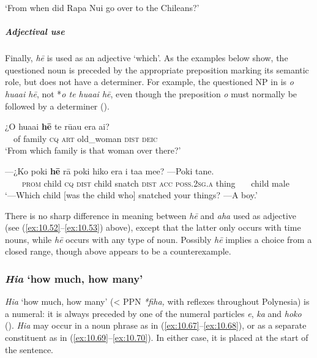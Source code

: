 \glt 
‘From when did Rapa Nui go over to the Chileans?’ \textstyleExampleref{[R616.673]} 
\z

\subparagraph{Adjectival use} Finally, \textit{hē} is used as an adjective ‘which’. As the examples below show, the questioned noun is preceded by the appropriate preposition marking its semantic role, but does not have a determiner. For example, the questioned NP in  is \textit{o hua{\ꞌ}ai hē}, not *\textit{o te hua{\ꞌ}ai hē}, even though the preposition \textit{o} must normally be followed by a determiner ().

\ea\label{ex:10.65}
\gll ¿O hua{\ꞌ}ai \textbf{hē} te rū{\ꞌ}au era {\ꞌ}ai? \\
~~of family \textsc{cq} \textsc{art} old\_woman \textsc{dist} \textsc{deic} \\

\glt 
‘From which family is that woman over there?’ \textstyleExampleref{[R413.305]} 
\z

\ea\label{ex:10.66}
\gll —¿Ko poki \textbf{hē} rā poki hiko era i ta{\ꞌ}a me{\ꞌ}e? —Poki tane. \\
~~~~\textsc{prom} child \textsc{cq} \textsc{dist} child snatch \textsc{dist} \textsc{acc} \textsc{poss.2sg.a} thing ~~~child male \\

\glt
‘—Which child [was the child who] snatched your things? —A boy.’ \textstyleExampleref{[R172.012–014]}
\z

There is no sharp difference in meaning between \textit{hē} and \textit{aha} used as adjective (see (\ref{ex:10.52}–\ref{ex:10.53}) above), except that the latter only occurs with time nouns, while \textit{hē} occurs with any type of noun. Possibly \textit{hē} implies a choice from a closed range, though  above appears to be a counterexample.

\subsubsection{\textit{Hia} ‘how much, how many’}\label{sec:10.3.2.4}
\textit{Hia} ‘how much, how many’ ({\textless} PPN \textit{*fiha,} with reflexes throughout Polynesia) is a numeral: it is always preceded by one of the numeral particles \textit{e}, \textit{ka} and \textit{hoko} (). \textit{Hia} may occur in a noun phrase as in (\ref{ex:10.67}–\ref{ex:10.68}), or as a separate constituent as in (\ref{ex:10.69}–\ref{ex:10.70}). In either case, it is placed at the start of the sentence.

